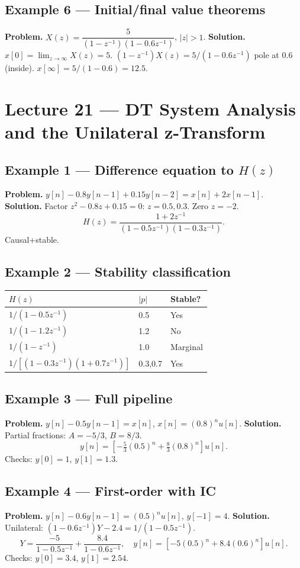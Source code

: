 \documentclass[11pt]{article}
\begin{document}
\subsection{Example 6 --- Initial/final value theorems}
\textbf{Problem.} $X(z)=\dfrac{5}{(1-z^{-1})(1-0.6 z^{-1})}$, $|z|>1$.
\textbf{Solution.} $x[0]=\lim_{z\to\infty}X(z)=5$. $(1-z^{-1})X(z)=5/(1-0.6 z^{-1})$ pole at $0.6$ (inside). $x[\infty]=5/(1-0.6)=12.5$.

\section{Lecture 21 --- DT System Analysis and the Unilateral z-Transform}

\subsection{Example 1 --- Difference equation to $H(z)$}
\textbf{Problem.} $y[n]-0.8 y[n-1]+0.15 y[n-2]=x[n]+2x[n-1]$.
\textbf{Solution.} Factor $z^2-0.8 z+0.15=0$: $z=0.5,0.3$. Zero $z=-2$.
\[H(z)=\frac{1+2z^{-1}}{(1-0.5 z^{-1})(1-0.3 z^{-1})}.\]
Causal+stable.

\subsection{Example 2 --- Stability classification}
\begin{center}
\begin{tabular}{l l l}
\hline
$H(z)$ & $|p|$ & Stable?\\
\hline
$1/(1-0.5 z^{-1})$ & 0.5 & Yes\\
$1/(1-1.2 z^{-1})$ & 1.2 & No\\
$1/(1-z^{-1})$ & 1.0 & Marginal\\
$1/[(1-0.3 z^{-1})(1+0.7 z^{-1})]$ & 0.3,0.7 & Yes\\
\hline
\end{tabular}
\end{center}

\subsection{Example 3 --- Full pipeline}
\textbf{Problem.} $y[n]-0.5 y[n-1]=x[n]$, $x[n]=(0.8)^n u[n]$.
\textbf{Solution.} Partial fractions: $A=-5/3$, $B=8/3$.
\[y[n]=\left[-\tfrac{5}{3}(0.5)^n+\tfrac{8}{3}(0.8)^n\right]u[n].\]
Checks: $y[0]=1$, $y[1]=1.3$.

\subsection{Example 4 --- First-order with IC}
\textbf{Problem.} $y[n]-0.6 y[n-1]=(0.5)^n u[n]$, $y[-1]=4$.
\textbf{Solution.} Unilateral: $(1-0.6 z^{-1})Y-2.4=1/(1-0.5 z^{-1})$.
\[Y=\frac{-5}{1-0.5 z^{-1}}+\frac{8.4}{1-0.6 z^{-1}},\quad y[n]=[-5(0.5)^n+8.4(0.6)^n]u[n].\]
Checks: $y[0]=3.4$, $y[1]=2.54$.
\end{document}
